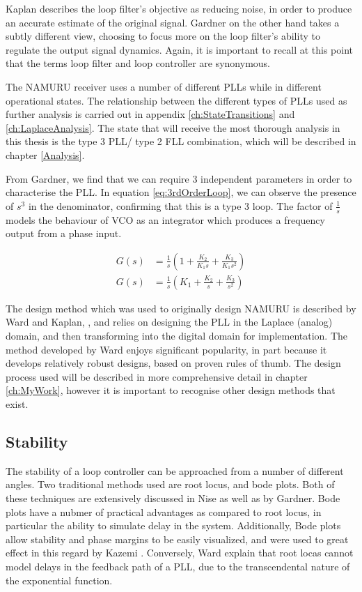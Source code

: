 	Kaplan describes the loop filter's objective as reducing noise, in order to produce an accurate estimate of the original signal\cite{Kaplan}. Gardner on the other hand takes a subtly different view, choosing to focus more on the loop filter's ability to regulate the output signal dynamics\cite{Gardner}. Again, it is important to recall at this point that the terms loop filter and loop controller are synonymous. 
	
	
	The \ac{NAMURU} receiver uses a number of different PLLs while in different operational states. The relationship between the different types of PLLs used as further analysis is carried out in appendix \ref{ch:StateTransitions} and \ref{ch:LaplaceAnalysis}. The state that will receive the most thorough analysis in this thesis is the type 3 PLL/ type 2 FLL combination, which will be described in chapter \ref{Analysis}. 
	
	
	From Gardner, we find that we can require 3 independent parameters in order to characterise the PLL\cite{Gardner}. In equation \ref{eq:3rdOrderLoop}, we can observe the presence of $s^3$ in the denominator, confirming that this is a type 3 loop. The factor of $\frac{1}{s}$ models the behaviour of \ac{VCO} as an integrator which produces a frequency output from a phase input. 
	
	
	\begin{align}
	G(s) &= \frac{1}{s}(1 + \frac{K_2}{K_1s} + \frac{K_3}{K_1s^2})\\
	G(s) &= \frac{1}{s}(K_1 + \frac{K_2}{s} + \frac{K_3}{s^2})
	\label{eq:3rdOrderLoopGardner}
	\end{align}

	The design method which was used to originally design \ac{NAMURU} is described by Ward and Kaplan, \cite{Ward,Kaplan}, and relies on designing the PLL in the Laplace (analog) domain, and then transforming into the digital domain for implementation. The method developed by Ward enjoys significant popularity, in part because it develops relatively robust designs, based on proven rules of thumb. The design process used will be described in more comprehensive detail in chapter \ref{ch:MyWork}, however it is important to recognise other design methods that exist. 
	
	\subsection{Stability}
	The stability of a loop controller can be approached from a number of different angles. Two traditional methods used are root locus, and bode plots. Both of these techniques are extensively discussed in Nise as well as by Gardner\cite{Nise,Gardner}. Bode plots have a nubmer of practical advantages as compared to root locus, in particular the ability to simulate delay in the system. Additionally, Bode plots allow stability and phase margins to be easily visualized, and were used to great effect in this regard by Kazemi \cite{KazemiPHD}.  Conversely, Ward explain that root locas cannot model delays in the feedback path of a PLL, due to the transcendental nature of the exponential function.

